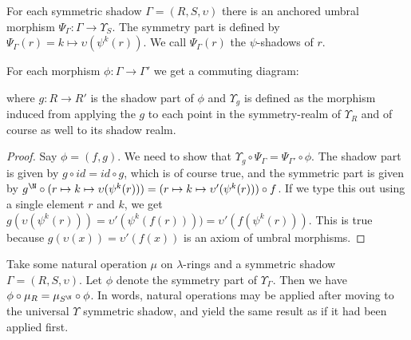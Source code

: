 \begin{propdef}
  For each symmetric shadow $\Gamma = (R, S, \upsilon)$ there is an anchored umbral morphism $\Psi_{\Gamma} : \Gamma \to \Upsilon_S$. The symmetry part is defined by $\Psi_{\Gamma}(r) = k \mapsto \upsilon(\psi^k(r))$. We call $\Psi_{\Gamma}(r)$ the $\psi$-shadows of $r$.
\end{propdef}

\begin{propdef} \label{propdef:upsilonUniversalDiagram}
  For each morphism $\phi : \Gamma \to \Gamma'$ we get a commuting diagram:
  \begin{center}
  \end{center}
  where $g : R \to R'$ is the shadow part of $\phi$ and $\Upsilon_{g}$ is defined as the morphism induced from applying the $g$ to each point in the symmetry-realm of $\Upsilon_R$ and of course as well to its shadow realm.
\end{propdef}

\begin{proof}
  Say $\phi = (f, g)$. We need to show that $\Upsilon_{g} \circ \Psi_\Gamma = \Psi_{\Gamma'} \circ \phi$. The shadow part is given by $g \circ id = id \circ g$, which is of course true, and the symmetric part is given by $g^{\N} \circ (r \mapsto k \mapsto \upsilon(\psi^k(r))) = (r \mapsto k \mapsto \upsilon'(\psi^k(r))) \circ f$. If we type this out using a single element $r$ and $k$, we get $g(\upsilon(\psi^k(r))) = \upsilon'(\psi^k(f(r)))) = \upsilon'(f(\psi^k(r)))$. This is true because $g(\upsilon(x)) = \upsilon'(f(x))$ is an axiom of umbral morphisms. \qedhere
\end{proof}

\begin{proposition} \label{prop:naturalCommutativity}
  Take some natural operation $\mu$ on $\lambda$-rings and a symmetric shadow $\Gamma = (R, S, \upsilon)$. Let $\phi$ denote the symmetry part of $\Upsilon_\Gamma$. Then we have $\phi \circ \mu_R = \mu_{S^{\N}} \circ \phi$. In words, natural operations may be applied after moving to the universal $\Upsilon$ symmetric shadow, and yield the same result as if it had been applied first.
\end{proposition}

